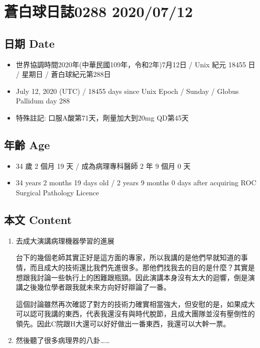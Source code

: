 \documentclass[
]{article}
\providecommand{\tightlist}{%
  \setlength{\itemsep}{0pt}\setlength{\parskip}{0pt}}
\begin{document}
\hypertarget{ux84bcux767dux7403ux65e5ux8a8c0288-20200712}{%
\section{蒼白球日誌0288
2020/07/12}\label{ux84bcux767dux7403ux65e5ux8a8c0288-20200712}}

\hypertarget{ux65e5ux671f-date-11}{%
\subsection{日期 Date}\label{ux65e5ux671f-date-11}}

\begin{itemize}
\tightlist
\item
  世界協調時間2020年(中華民國109年，令和2年)7月12日 / Unix 紀元 18455 日
  / 星期日 / 蒼白球紀元第288日
\item
  July 12, 2020 (UTC) / 18455 days since Unix Epoch / Sunday / Globus
  Pallidum day 288
\item
  特殊註記: 口服A酸第71天，劑量加大到20mg QD第45天
\end{itemize}

\hypertarget{ux5e74ux9f61-age-11}{%
\subsection{年齡 Age}\label{ux5e74ux9f61-age-11}}

\begin{itemize}
\tightlist
\item
  34 歲 2 個月 19 天 / 成為病理專科醫師 2 年 9 個月 0 天
\item
  34 years 2 months 19 days old / 2 years 9 months 0 days after
  acquiring ROC Surgical Pathology Licence
\end{itemize}

\hypertarget{ux672cux6587-content-11}{%
\subsection{本文 Content}\label{ux672cux6587-content-11}}

\begin{enumerate}
\def\labelenumi{\arabic{enumi}.}
\item
  去成大演講病理機器學習的進展

  台下的幾個老師其實正好是這方面的專家，所以我講的是他們早就知道的事情，而且成大的技術還比我們先進很多。那他們找我去的目的是什麼？其實是想跟我討論一些執行上的困難跟瓶頸。因此演講本身沒有太大的迴響，倒是演講之後幾位學者跟我就未來方向好好辯論了一番。

  這個討論雖然再次確認了對方的技術力確實相當強大，但安慰的是，如果成大可以認可我講的東西，代表我還沒有與時代脫節，且成大團隊並沒有壓倒性的領先。因此C院跟H大還可以好好做出一番東西，我還可以大幹一票。
\item
  然後聽了很多病理界的八卦\ldots\ldots{}
\end{enumerate}
\end{document}

